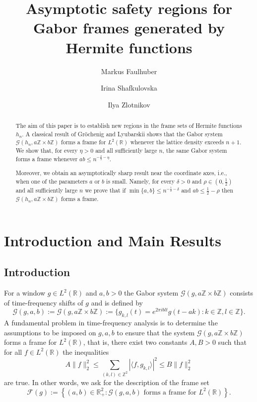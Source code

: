 \documentclass[11pt]{amsart}
\title[Asymptotic safety regions for Hermite functions]{Asymptotic safety regions for Gabor frames generated by Hermite functions}
\author[Faulhuber]{Markus Faulhuber}
\author[Shafkulovska]{Irina Shafkulovska}
\author[Zlotnikov]{Ilya Zlotnikov}
\numberwithin{equation}{section}
\newcommand{\R}{{\mathbb R}}
\newcommand{\Z}{{\mathbb Z}}
\begin{document}
\begin{abstract}

The aim of this paper is to establish new regions in the frame sets of Hermite functions $h_n$. 
A classical result of Gr\"ochenig and Lyubarskii shows that the Gabor system
$\mathcal{G}(h_n,a\Z\times b\Z)$ forms a frame for $L^2(\R)$ whenever the lattice density exceeds $n+1$. 
We show that, for every $\eta>0$ and all sufficiently large $n$, the same Gabor system forms a frame whenever
$ab\leq n^{-\frac{2}{3}-\eta}$.

Moreover, we obtain an asymptotically sharp result near the coordinate
axes, i.e., when one of the parameters $a$ or $b$ is small. Namely, for every $\delta>0$ and $\rho\in(0,\frac{1}{2})$ and all sufficiently large $n$ we prove that if $\min\{a,b\}\leq n^{-\frac{1}{2}-\delta}$ and
$ab\leq \frac{1}{2}-\rho$ then $\mathcal{G}(h_n,a\Z\times b\Z)$ forms a frame.

\end{abstract}

\date{}
\maketitle

\section{Introduction and Main Results}
\subsection{Introduction}
For a window $g\in L^2(\R)$ and $a,b>0$ the Gabor system $\mathcal{G}(g, a\Z \times b\Z)$ consists of time-frequency shifts of $g$ and is defined by
$$
\mathcal{G}(g, a, b):=\mathcal{G}(g, a\Z \times b\Z) := \{g_{k, l}(t) = e^{2 \pi i b l t} g(t - ak) : k \in \Z, l \in \Z\}.
$$
A fundamental problem in time-frequency analysis is to determine the assumptions to be imposed on $g,a,b$ to ensure that the system $\mathcal{G}(g, a\Z \times b\Z)$ 
forms a frame for $L^2(\R)$, that is, there exist two constants $A, B > 0$ such that for all $f\in L^2(\R)$ the inequalities
$$A\|f\|_2^2 \le\sum_{(k, l)\in \Z^2}|\langle f, g_{k,l}\rangle|^2 \le B\|f\|_2^2$$
are true. In other words, we ask for the description of the frame set 
\begin{equation}
    \mathcal{F}(g):= \left\{(a,b) \in \R^2_+ : \mathcal{G}(g,a,b) \text{ forms a frame for } L^2(\R) \right\}.
\end{equation}
\end{document}

